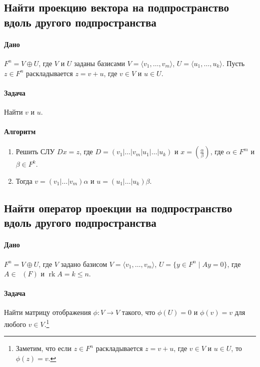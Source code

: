 \documentclass{article}
\newcommand{\MatrixDim}[3]{\mathop{\mathrm{M}_{#2\,#3}}(#1)}
\newcommand{\rk}{\operatorname{rk}}
\begin{document}
\subsection{Найти проекцию вектора на подпространство вдоль другого подпространства}

\paragraph{Дано} $F^{n} = V \oplus U$, где $V$ и $U$ заданы базисами $V = \langle v_1,\ldots,v_m\rangle$, $U = \langle u_1,\ldots,u_k\rangle$. Пусть $z\in F^{n}$ раскладывается $z = v + u$, где $v\in V$ и $u\in U$.

\paragraph{Задача} Найти $v$ и $u$.

\paragraph{Алгоритм}
\begin{enumerate}
\item Решить СЛУ $D x = z$, где $D = (v_1|\ldots|v_m|u_1|\ldots|u_k)$ и $x = \left(\frac{\alpha}{\beta}\right)$, где $\alpha\in F^{m}$ и $\beta\in F^{k}$.

\item Тогда $v = (v_1|\ldots|v_m)\alpha$ и $u = (u_1|\ldots|u_k)\beta$.
\end{enumerate}

\subsection{Найти оператор проекции на подпространство вдоль другого подпространства}

\paragraph{Дано} $F^{n} = V \oplus U$, где $V$ задано базисом $V = \langle v_1,\ldots,v_m\rangle$, $U = \{y\in F^{n}\mid Ay = 0\}$, где $A\in \MatrixDim{F}{k}{n}$ и $\rk A = k \leqslant n$. 

\paragraph{Задача} Найти матрицу отображения $\phi\colon V\to V$ такого, что $\phi(U) = 0$ и $\phi(v) = v$ для любого $v\in V$.\footnote{Заметим, что если $z\in F^{n}$ раскладывается $z = v + u$, где $v\in V$ и $u\in U$, то $\phi(z) = v$.}
\end{document}

